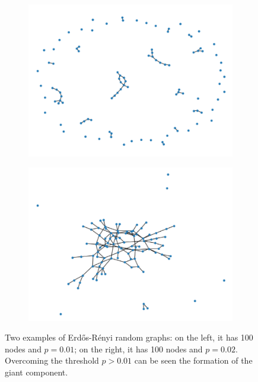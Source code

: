 \begin{figure}[ht!]
    \centering
    \begin{subfigure}[t]{0.49\textwidth}
        \centering
        \includegraphics[width=\linewidth]{image/E_R_N100_p0,01.png}
    \end{subfigure}
    \hfill
    \begin{subfigure}[t]{0.49\textwidth}
        \centering
        \includegraphics[width=\linewidth]{image/E_R_N100_p0,02.png}
    \end{subfigure}
    \caption{Two examples of Erd\H{o}s-Rényi random graphs: on the left, it has 100 nodes and $p = 0.01$; on the right, it has 100 nodes and $p = 0.02$. Overcoming the threshold $p > 0.01$ can be seen the formation of the giant component.}
    \label{E-R_example}
\end{figure}

